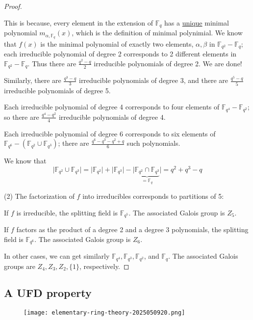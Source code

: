 \begin{proof}
\begin{note}
This is because, every element in the extension of $\mathbb{F}_{q}$ has a \underline{unique} minimal polynomial $m_{\alpha,\mathbb{F}_{q}}(x)$, which is the definition of minimal polynimial. We know that $f(x)$ is the minimal polynomial of exactly two elements, $\alpha,\beta$ in $\mathbb{F}_{q^2}-\mathbb{F}_{q}$; each irreducible polynomial of degree 2 corresponds to 2 different elements in $\mathbb{F}_{q^2}-\mathbb{F}_{q}$. Thus there are $\frac{q^2-q}{2}$ irreducible polynomials of degree 2. We are done!
\end{note}
Similarly, there are $\frac{q^3-q}{3}$ irreducible polynomials of degree 3, and there are $\frac{q^5-q}{5}$ irreducible polynomials of degree 5.

Each irreducible polynomial of degree 4 corresponds to four elements of $\mathbb{F}_{q^4}-\mathbb{F}_{q^2}$; so there are $\frac{q^4-q^2}{4}$ irreducible polynomials of degree 4.

Each irreducible polynomial of degree 6 corresponds to six elements of $\mathbb{F}_{q^6}-(\mathbb{F}_{q^2} \cup \mathbb{F}_{q^3})$; there are $\frac{q^6-q^3-q^2+q}{6}$ such polynomials.

\begin{note}
We know that
\[
\lvert \mathbb{F}_{q^2}\cup \mathbb{F}_{q^{3}} \rvert=\lvert \mathbb{F}_{q^2} \rvert+\lvert \mathbb{F}_{q^3} \rvert-\lvert \underbrace{ \mathbb{F}_{q^2}\cap \mathbb{F}_{q^{3}} }_{ =\mathbb{F}_{q} } \rvert=q^2+q^{3}-q
\]
\end{note}
(2) The factorization of $f$ into irreducibles corresponds to partitions of 5:

If $f$ is irreducible, the splitting field is $\mathbb{F}_{q^5}$. The associated Galois group is $Z_5$.

If $f$ factors as the product of a degree 2 and a degree 3 polynomials, the splitting field is $\mathbb{F}_{q^6}$. The associated Galois group is $Z_6$.

In other cases, we can get similarly $\mathbb{F}_{q^4}, \mathbb{F}_{q^3}, \mathbb{F}_{q^2}$, and $\mathbb{F}_q$. The associated Galois groups are $Z_4, Z_3, Z_2, \{1\}$, respectively.
\end{proof}

\subsection{A UFD property}

\begin{figure}[H]
\centering
\texttt{[image: elementary-ring-theory-2025050920.png]}
\label{}
\end{figure}

